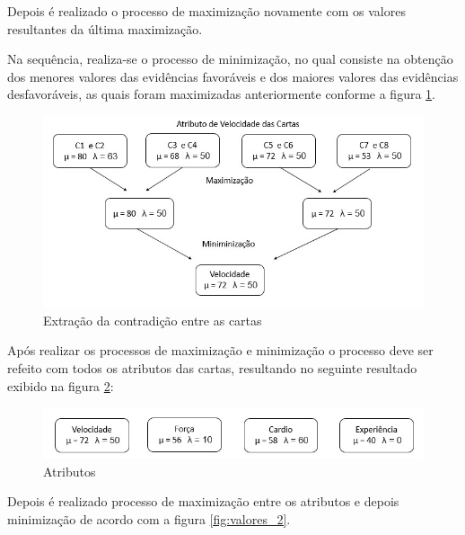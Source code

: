 Depois é realizado o processo de maximização novamente com os valores resultantes da última maximização.

Na sequência, realiza-se o processo de minimização, no qual consiste na obtenção dos menores valores das evidências favoráveis e dos maiores valores das evidências desfavoráveis, as quais foram maximizadas anteriormente conforme a figura \ref{fig:oito}.

\begin{figure}[htb]
	\caption{
		\label{fig:oito}
		Extração da contradição entre as cartas
	}
	\begin{center}
		\includegraphics[scale=0.5]{imagens/valores.jpeg}
	\end{center}
\end{figure}	
	
Após realizar os processos de maximização e minimização o processo deve ser refeito com todos os atributos das cartas, resultando no seguinte resultado exibido na figura \ref{fig:atributo}:

\begin{figure}[htb]
	\caption{
		\label{fig:atributo} 
		Atributos
	}
	\begin{center}
		\includegraphics[scale=0.5]{imagens/atributo.jpeg}
	\end{center}
\end{figure}	

\newpage

Depois é realizado processo de maximização entre os atributos e depois minimização de acordo com a figura \ref{fig:valores_2}.

